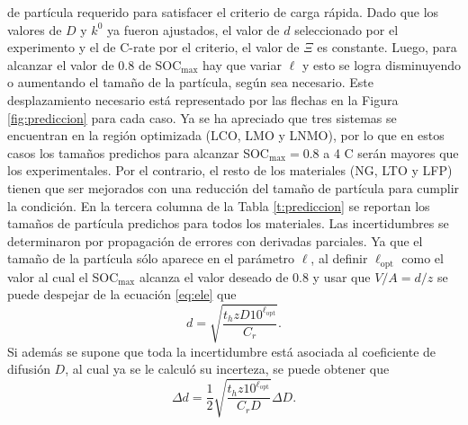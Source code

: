 de partícula requerido para satisfacer el criterio de carga rápida. Dado que los
valores de $D$ y $k^0$ ya fueron ajustados, el valor de $d$ seleccionado por el
experimento y el de C-rate por el criterio, el valor de $\Xi$ es constante. Luego,
para alcanzar el valor de 0.8 de SOC$_{\max}$ hay que variar $\ell$ y esto se
logra disminuyendo o aumentando el tamaño de la partícula, según sea necesario. 
Este desplazamiento necesario está representado por las flechas en la Figura 
\ref{fig:prediccion} para cada caso. Ya se ha apreciado que tres sistemas se 
encuentran en la región optimizada (LCO, LMO y LNMO), por lo que en estos casos
los tamaños predichos para alcanzar SOC$_{\max} = 0.8$ a 4 C serán mayores que 
los experimentales. Por el contrario, el resto de los materiales (NG, LTO y LFP) 
tienen que ser mejorados con una reducción del tamaño de partícula
para cumplir la condición. En la tercera columna de la Tabla \ref{t:prediccion} 
se reportan los tamaños de partícula predichos para todos los materiales. 
Las incertidumbres se determinaron por propagación de errores con 
derivadas parciales. Ya que el tamaño de la partícula sólo aparece en el parámetro
$\ell$, al definir $\ell_{\text{opt}}$ como el valor al cual el SOC$_{\max}$ 
alcanza el valor deseado de 0.8 y usar que $V/A = d/z$ se puede despejar de la 
ecuación \ref{eq:ele} que
\begin{equation}
    d = \sqrt{\frac{t_h z D 10^{\ell_{\text{opt}}}}{C_r}}.
\end{equation}
Si además se supone que toda la incertidumbre está asociada al coeficiente de 
difusión $D$, al cual ya se le calculó su incerteza, se puede obtener que
\begin{equation}
    \Delta d = \frac{1}{2} \sqrt{\frac{t_h z 10^{\ell_{\text{opt}}}}{C_r D}} \Delta D.
\end{equation}

